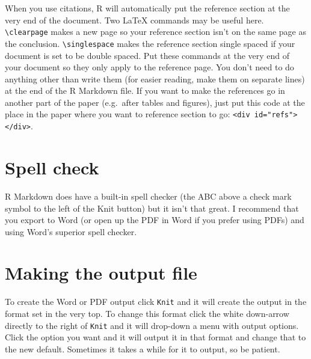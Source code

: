 \documentclass[
  a4paper,
]{krantz}
\begin{document}
When you use citations, R will automatically put the
reference section at the very end of the document. Two LaTeX
commands may be useful here.
\texttt{\textbackslash{}clearpage} makes a new page so your
reference section isn't on the same page as the conclusion.
\texttt{\textbackslash{}singlespace} makes the reference
section single spaced if your document is set to be double
spaced. Put these commands at the very end of your document
so they only apply to the reference page. You don't need to
do anything other than write them (for easier reading, make
them on separate lines) at the end of the R Markdown file.
If you want to make the references go in another part of the
paper (e.g.~after tables and figures), just put this code at
the place in the paper where you want to reference section
to go:
\texttt{\textless{}div\ id="refs"\textgreater{}\textless{}/div\textgreater{}}.

\hypertarget{spell-check}{%
\section{Spell check}\label{spell-check}}

R Markdown does have a built-in spell checker (the ABC above
a check mark symbol to the left of the Knit button) but it
isn't that great. I recommend that you export to Word (or
open up the PDF in Word if you prefer using PDFs) and using
Word's superior spell checker.

\hypertarget{making-the-output-file}{%
\section{Making the output
file}\label{making-the-output-file}}

To create the Word or PDF output click \texttt{Knit} and it
will create the output in the format set in the very top. To
change this format click the white down-arrow directly to
the right of \texttt{Knit} and it will drop-down a menu with
output options. Click the option you want and it will output
it in that format and change that to the new default.
Sometimes it takes a while for it to output, so be patient.
\end{document}
